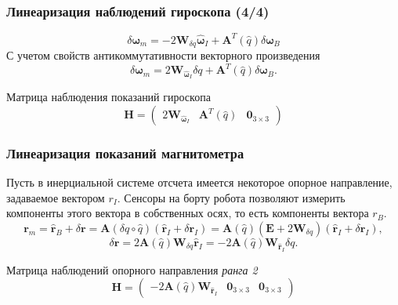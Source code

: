 \documentclass[utf8]{beamer}
\begin{document}
\begin{frame}
    \frametitle{Линеаризация наблюдений гироскопа (4/4)}
$$
\delta \mathbf{\omega}_m = 
-2\mathbf{W}_{\delta q}\hat{\mathbf{\omega}}_I + 
\mathbf{A}^T\left(\hat{q}\right)\delta\mathbf{\omega}_B
$$
С учетом свойств антикоммутативности векторного произведения
$$
\delta \mathbf{\omega}_m = 2\mathbf{W}_{\hat{\mathbf{\omega}}_I} \delta q+ 
\mathbf{A}^T\left(\hat{q}\right)\delta\mathbf{\omega}_B.
$$
\begin{block}{Матрица наблюдения показаний гироскопа}
$$
\mathbf{H} = \left(\begin{array}{ccc}
2\mathbf{W}_{\hat{\mathbf{\omega}}_I} &
\mathbf{A}^T\left(\hat{q}\right) &
\mathbf{0}_{3\times 3}
\end{array}\right)
$$
\end{block}
\end{frame}
\begin{frame}
\frametitle{Линеаризация показаний магнитометра}
Пусть в инерциальной системе отсчета имеется некоторое опорное направление,
задаваемое вектором $r_I$. Сенсоры на борту робота позволяют измерить
компоненты этого вектора в собственных осях, то есть компоненты вектора $r_B$.
$$
\mathbf{r}_m = \hat{\mathbf{r}}_B + \delta \mathbf{r} = \mathbf{A}\left(\delta
q\circ \hat{q}\right)\left(\hat{\mathbf{r}}_I + \delta \mathbf{r}_I\right) = 
\mathbf{A}\left(\hat{q}\right)
\left(\mathbf{E} + 2\mathbf{W}_{\delta q}\right)\left(\hat{\mathbf{r}}_I +
\delta \mathbf{r}_I\right),
$$
$$
\delta \mathbf{r} =
2\mathbf{A}\left(\hat{q}\right)\mathbf{W}_{\delta q}\hat{\mathbf{r}}_I = 
-2\mathbf{A}\left(\hat{q}\right)\mathbf{W}_{\hat{\mathbf{r}}_I}\delta q.
$$
\begin{block}{Матрица наблюдений опорного направления \emph{ранга 2}}
$$
\mathbf{H} = \left(\begin{array}{ccc}
-2\mathbf{A}\left(\hat{q}\right)\mathbf{W}_{\hat{\mathbf{r}}_I} &
\mathbf{0}_{3\times 3} &
\mathbf{0}_{3\times 3}
\end{array}\right)
$$
\end{block}
\end{frame}
\end{document}
